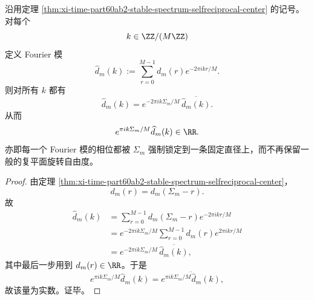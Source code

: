 \begin{theorem}\label{thm:xi-time-part60ab2-stable-spectrum-fourier-phase-locking}
沿用定理 \ref{thm:xi-time-part60ab2-stable-spectrum-selfreciprocal-center} 的记号。对每个
\[
k\in \ZZ/(M\ZZ)
\]
定义 Fourier 模
\[
\widehat d_m(k):=\sum_{r=0}^{M-1}d_m(r)e^{-2\pi i kr/M}.
\]
则对所有 \(k\) 都有
\[
\widehat d_m(k)=e^{-2\pi i k\Sigma_m/M}\,\overline{\widehat d_m(k)}.
\]
从而
\[
e^{\pi i k\Sigma_m/M}\widehat d_m(k)\in \RR.
\]
亦即每一个 Fourier 模的相位都被 \(\Sigma_m\) 强制锁定到一条固定直径上，而不再保留一般的复平面旋转自由度。
\end{theorem}
\begin{proof}
由定理 \ref{thm:xi-time-part60ab2-stable-spectrum-selfreciprocal-center}，
\[
d_m(r)=d_m(\Sigma_m-r).
\]
故
\[
\begin{aligned}
\widehat d_m(k)
&=
\sum_{r=0}^{M-1}d_m(\Sigma_m-r)e^{-2\pi i kr/M}\\
&=
e^{-2\pi i k\Sigma_m/M}
\sum_{r=0}^{M-1}d_m(r)e^{2\pi i kr/M}\\
&=
e^{-2\pi i k\Sigma_m/M}\,\overline{\widehat d_m(k)},
\end{aligned}
\]
其中最后一步用到 \(d_m(r)\in \RR\)。于是
\[
e^{\pi i k\Sigma_m/M}\widehat d_m(k)
=
\overline{e^{\pi i k\Sigma_m/M}\widehat d_m(k)},
\]
故该量为实数。证毕。
\end{proof}

